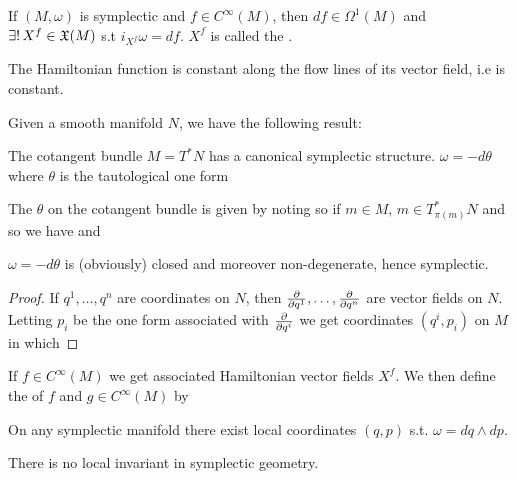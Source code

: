 \documentclass{article}
\begin{document}
\begin{definition}
If $(M,\omega)$ is symplectic and $f \in C^\infty(M)$, then $df \in \Omega^1(M)$ and $\exists ! \, X^f \in \mathfrak{X}(M)$ s.t $i_{X^f}\omega = df$. $X^f$ is called the . 
\end{definition}

\begin{lemma}
The Hamiltonian function is constant along the flow lines of its vector field, i.e 
is constant.
\end{lemma}

Given a smooth manifold $N$, we have the following result:

\begin{theorem}
The cotangent bundle $M= T^\ast N$ has a canonical symplectic structure. $\omega = - d\theta$ where $\theta$ is the tautological one form 
\end{theorem}

\begin{definition}
The  $\theta$ on the cotangent bundle is given by noting 
so if $ m \in M, \, m \in T_{\pi(m)}^\ast N$ and so we have 
and 
\end{definition}

\begin{lemma}
$\omega = -d\theta$ is (obviously) closed and moreover non-degenerate, hence symplectic. 
\end{lemma}
\begin{proof}
If $q^1, \dots, q^n$ are coordinates on $N$, then $\frac{\partial}{\partial q^1}, \dots, \frac{\partial}{\partial q^n}$ are vector fields on $N$. Letting $p_i$ be the one form associated with $\frac{\partial}{\partial q^i}$ we get coordinates $(q^i,p_i)$ on $M$ in which 
\end{proof}

\begin{aside}
If $f \in C^\infty(M)$ we get associated Hamiltonian vector fields $X^f$. We then define the  of $f$ and $g \in C^\infty(M)$ by 
\end{aside}

\begin{theorem}[Darboux]
	On any symplectic manifold there exist local coordinates $(q,p)$ s.t. $\omega = dq \wedge dp$. 
\end{theorem}
\begin{corollary}
	There is no local invariant in symplectic geometry. 
\end{corollary}
\end{document}
